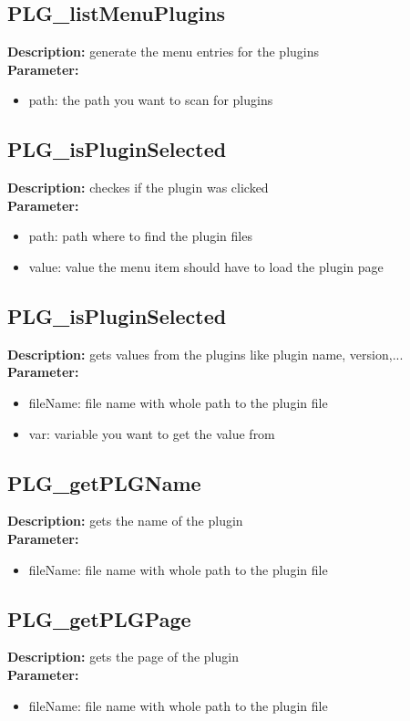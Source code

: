 \subsection{PLG\_listMenuPlugins}
\textbf{Description:} generate the menu entries for the plugins\\
\textbf{Parameter:}
\begin{itemize}
\item path: the path you want to scan for plugins
\end{itemize}

\subsection{PLG\_isPluginSelected}
\textbf{Description:} checkes if the plugin was clicked\\
\textbf{Parameter:}
\begin{itemize}
\item path: path where to find the plugin files
\item value: value the menu item should have to load the plugin page
\end{itemize}

\subsection{PLG\_isPluginSelected}
\textbf{Description:} gets values from the plugins like plugin name, version,...\\
\textbf{Parameter:}
\begin{itemize}
\item fileName: file name with whole path to the plugin file
\item var: variable you want to get the value from
\end{itemize}

\subsection{PLG\_getPLGName}
\textbf{Description:} gets the name of the plugin\\
\textbf{Parameter:}
\begin{itemize}
\item fileName: file name with whole path to the plugin file
\end{itemize}

\subsection{PLG\_getPLGPage}
\textbf{Description:} gets the page of the plugin\\
\textbf{Parameter:}
\begin{itemize}
\item fileName: file name with whole path to the plugin file
\end{itemize}

